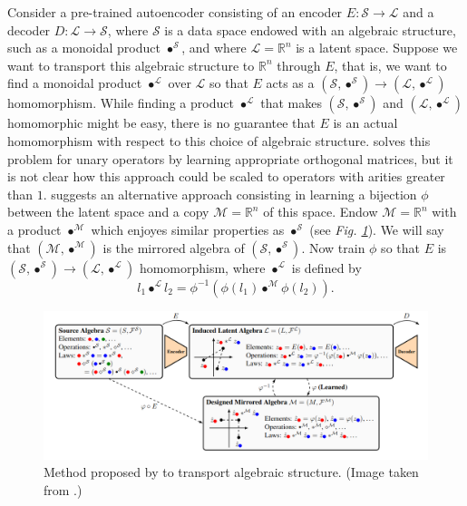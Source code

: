 \documentclass[11pt,a4paper,openright,twoside]{report}
\theoremstyle{plain}
\theoremstyle{definition}
\begin{document}
Consider a pre-trained autoencoder consisting of an encoder $E: \mathcal{S} \to \mathcal{L}$ and a decoder $D: \mathcal{L} \to \mathcal{S}$, where $\mathcal{S}$ is a data space endowed with an algebraic structure, such as a monoidal product $\bullet^{\mathcal{S}}$, and where $\mathcal{L}=\mathbb{R}^n$ is a latent space. Suppose we want to transport this algebraic structure to $\mathbb{R}^n$ through $E$, that is, we want to find a monoidal product $\bullet^{\mathcal{L}}$ over $\mathcal{L}$ so that $E$ acts as a $(\mathcal{S},\bullet^{\mathcal{S}}) \to (\mathcal{L},\bullet^{\mathcal{L}})$ homomorphism. While finding a product $\bullet^{\mathcal{L}}$ that makes $(\mathcal{S},\bullet^{\mathcal{S}})$ and $(\mathcal{L},\bullet^{\mathcal{L}})$ homomorphic might be easy, there is no guarantee that $E$ is an actual homomorphism with respect to this choice of algebraic structure. \cite{chytas2024poolingimagedatasetsmultiple} solves this problem for unary operators by learning appropriate orthogonal matrices, but it is not clear how this approach could be scaled to operators with arities greater than $1$.  \cite{pfrommer2024transport} suggests an alternative approach consisting in learning a bijection $\phi$ between the latent space and a copy $\mathcal{M} = \mathbb{R}^n$ of this space. Endow $\mathcal{M} = \mathbb{R}^n$ with a product $\bullet^{\mathcal{M}}$ which enjoyes similar properties as $\bullet^{\mathcal{S}}$ (see \textit{Fig. \ref{fig: algtransport}}). We will say that $(\mathcal{M},\bullet^{\mathcal{M}})$ is the mirrored algebra of $(\mathcal{S},\bullet^{\mathcal{S}})$. Now train $\phi$ so that $E$ is $(\mathcal{S},\bullet^{\mathcal{S}}) \to (\mathcal{L},\bullet^{\mathcal{L}})$ homomorphism, where $\bullet^{\mathcal{L}}$ is defined by
\[l_1 \bullet^{\mathcal{L}} l_2 = \phi^{-1}(\phi(l_1) \bullet^{\mathcal{M}} \phi(l_2)).\]

\begin{figure}[h]
  \begin{center}
    \includegraphics[width=1\textwidth]{figures/transport_of_algebraic_structure.png}     
    \caption[Transport of algebraic structure]{Method proposed by \cite{pfrommer2024transport} to transport algebraic structure. (Image taken from \cite{pfrommer2024transport}.)}
    \label{fig: algtransport}
  \end{center}
\end{figure}
\end{document}
